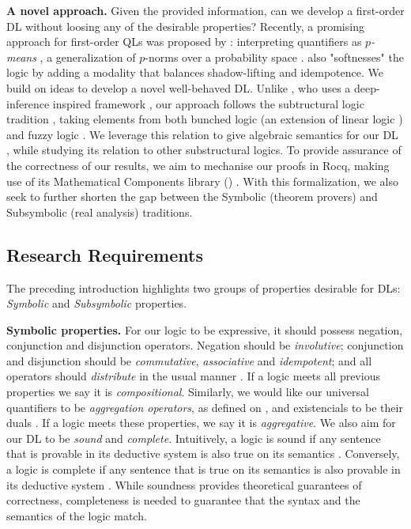 \textbf{A novel approach.} Given the provided information, can we develop a first-order DL without loosing any of the desirable properties?   Recently, a promising approach for first-order QLs was proposed by \mcita{}: interpreting quantifiers as \textit{$p$-means} \mcita{}, a generalization of $p$-norms over a probability space \mcita{}. \mcita{} also "softnesses" the logic by adding a modality that balances shadow-lifting and idempotence. We build on \mcita{} ideas to develop a novel well-behaved DL. Unlike \mcita{}, who uses a deep-inference inspired framework \mcita{}, our approach follows the subtructural logic tradition \mcita{}, taking elements from both bunched logic \mcita{} (an extension of linear logic \mcita{}) and fuzzy logic \mcita{}. We leverage this relation to give algebraic semantics for our DL \mcita{}, while studying its relation to other substructural logics. To provide assurance of the correctness of our results, we aim to mechanise our proofs in Rocq, making use of its Mathematical Components library (\mathcomp{}) \cite{mathcomp}. With this formalization, we also seek to further shorten the gap between the Symbolic (theorem provers) and Subsymbolic (real analysis) traditions. 

\subsection{Research Requirements}
The preceding introduction highlights two groups of properties desirable for DLs: \emph{Symbolic} and \emph{Subsymbolic} properties. 

\textbf{Symbolic properties.} For our logic to be expressive, it should possess negation, conjunction and disjunction operators. Negation should be \emph{involutive}; conjunction and disjunction should be \emph{commutative}, \emph{associative} and \emph{idempotent}; and all operators should \emph{distribute} in the usual manner \mcita{}. If a logic meets all previous properties we say it is \emph{compositional}. Similarly, we would like our universal quantifiers to be \emph{aggregation operators}, as defined on \mcita{}, and existencials to be their duals \mcita{}. If a logic meets these properties, we say it is \emph{aggregative}.  We also aim for our DL to be \emph{sound} and \emph{complete}. Intuitively, a logic is sound if any sentence that is provable in its deductive system is also true on its semantics \mcita{}. Conversely, a logic is complete if any sentence that is true on its semantics is also provable in its deductive system \mcita{}. While soundness provides theoretical guarantees of correctness, completeness is needed to guarantee that the syntax and the semantics of the logic match.

